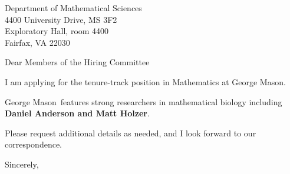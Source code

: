 




	
	
	\def\School{George Mason}
	
	\begin{letter}
		{Department of Mathematical Sciences\\
			4400 University Drive, MS 3F2\\
			Exploratory Hall, room 4400\\
			Fairfax, VA 22030
			
		}
		
		\opening{Dear Members of the Hiring Committee}
		
		
		I am applying for the tenure-track position in Mathematics at \School. 
		
		\School~features strong researchers in mathematical biology including \textbf{Daniel Anderson and Matt Holzer}. 
		
		
		
		
		
		Please request additional details as needed, and I look forward to our correspondence.
		
		\closing{Sincerely,}
	\end{letter}
